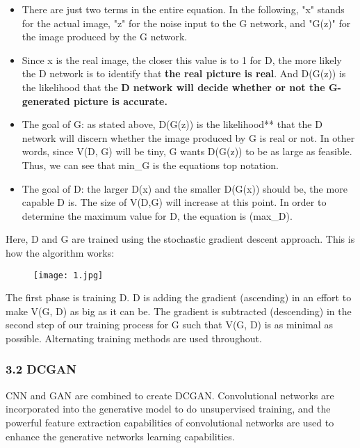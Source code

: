 \documentclass[
]{article}
\begin{document}
\begin{itemize}
\item
  There are just two terms in the entire equation. In the following, "x"
  stands for the actual image, "z" for the noise input to the G network,
  and "G(z)" for the image produced by the G network.
\item
  Since x is the real image, the closer this value is to 1 for D, the
  more likely the D network is to identify that \textbf{the real picture
  is real}. And D(G(z)) is the likelihood that the \textbf{D network
  will decide whether or not the G-generated picture is accurate. }
\item
  The goal of G: as stated above, D(G(z)) is the likelihood** that the D
  network will discern whether the image produced by G is real or not.
  In other words, since V(D, G) will be tiny, G wants D(G(z)) to be as
  large as feasible. Thus, we can see that min\_G is the
  equation\textquotesingle s top notation.
\item
  The goal of D: the larger D(x) and the smaller D(G(x)) should be, the
  more capable D is. The size of V(D,G) will increase at this point. In
  order to determine the maximum value for D, the equation is (max\_D).
\end{itemize}

Here, D and G are trained using the stochastic gradient descent
approach. This is how the algorithm works:

 \begin{figure}[htbp]
    \centering 
    \texttt{[image: 1.jpg]} 
\end{figure}

The first phase is training D. D is adding the gradient (ascending) in
an effort to make V(G, D) as big as it can be. The gradient is
subtracted (descending) in the second step of our training process for G
such that V(G, D) is as minimal as possible. Alternating training
methods are used throughout.

\hypertarget{32-dcgan}{%
\subsubsection{3.2 DCGAN}\label{32-dcgan}}

CNN and GAN are combined to create DCGAN. Convolutional networks are
incorporated into the generative model to do unsupervised training, and
the powerful feature extraction capabilities of convolutional networks
are used to enhance the generative network\textquotesingle s learning
capabilities.
\end{document}
